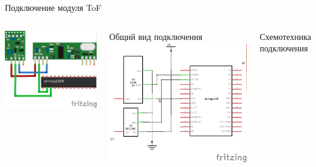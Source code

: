 \begin{frame}{Подключение модуля ToF}
    \begin{columns}
        \centering
        \includegraphics[width=1\linewidth]{../Figures/hardscheme.png}

        Общий вид подключения
        \centering
        \includegraphics[width=1\linewidth]{../Figures/circscheme.png}

        Схемотехника подключения
    \end{columns}
\end{frame}

